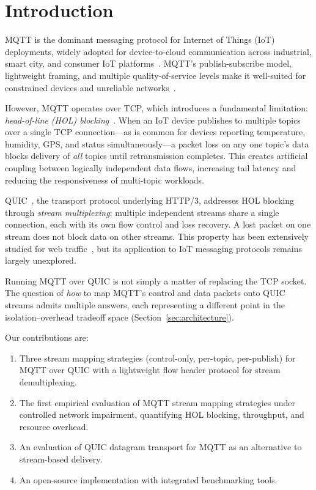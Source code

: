 \section{Introduction}
\label{sec:introduction}

MQTT is the dominant messaging protocol for Internet of Things (IoT) deployments, widely adopted for device-to-cloud communication across industrial, smart city, and consumer IoT platforms~\cite{bansal2020iot-mqtt-survey}. MQTT's publish-subscribe model, lightweight framing, and multiple quality-of-service levels make it well-suited for constrained devices and unreliable networks~\cite{mqtt-v5-spec}.

However, MQTT operates over TCP, which introduces a fundamental limitation: \emph{head-of-line (HOL) blocking}~\cite{rfc9000, kumar2019mqtt-quic}. When an IoT device publishes to multiple topics over a single TCP connection---as is common for devices reporting temperature, humidity, GPS, and status simultaneously---a packet loss on any one topic's data blocks delivery of \emph{all} topics until retransmission completes. This creates artificial coupling between logically independent data flows, increasing tail latency and reducing the responsiveness of multi-topic workloads.

QUIC~\cite{rfc9000}, the transport protocol underlying HTTP/3, addresses HOL blocking through \emph{stream multiplexing}: multiple independent streams share a single connection, each with its own flow control and loss recovery. A lost packet on one stream does not block data on other streams. This property has been extensively studied for web traffic~\cite{langley2017quic, kakhki2017quic, marx2020hol, yu2021quic}, but its application to IoT messaging protocols remains largely unexplored.

Running MQTT over QUIC is not simply a matter of replacing the TCP socket. The question of \emph{how} to map MQTT's control and data packets onto QUIC streams admits multiple answers, each representing a different point in the isolation--overhead tradeoff space (Section~\ref{sec:architecture}).

Our contributions are:
\begin{enumerate}
\item Three stream mapping strategies (control-only, per-topic, per-publish) for MQTT over QUIC with a lightweight flow header protocol for stream demultiplexing.
\item The first empirical evaluation of MQTT stream mapping strategies under controlled network impairment, quantifying HOL blocking, throughput, and resource overhead.
\item An evaluation of QUIC datagram transport for MQTT as an alternative to stream-based delivery.
\item An open-source implementation with integrated benchmarking tools.
\end{enumerate}

